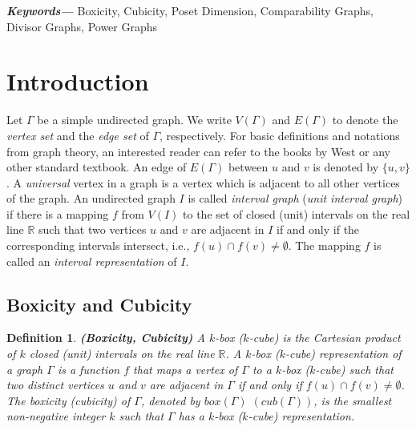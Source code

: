 \documentclass[twoside, 11pt]{article}
\newtheorem{definition}{Definition}
\newcommand{\G}{\Gamma}
\providecommand{\keywords}[1]
{
  \small	
  \textbf{\textit{Keywords---}} #1
}
\begin{document}
\keywords{Boxicity, Cubicity, Poset Dimension, Comparability Graphs, Divisor Graphs, Power Graphs}

\section{Introduction}\label{intro}

Let $\Gamma$ be a simple undirected graph. We write $V(\G)$ and $E(\G)$ to denote the \textit{vertex set} and the \textit{edge set} of $\G$, respectively. For basic definitions and notations from graph theory, an interested reader can refer to the books by West \cite{west2001introduction} or any other standard textbook. An edge of $E(\G)$ between $u$ and $v$ is denoted by $\{u,v\}$. A \textit{universal} vertex in a graph is a vertex which is adjacent to all other vertices of the graph. %
 An undirected graph $I$ is called \textit{interval graph} (\textit{unit interval graph}) if there is a mapping $f$ from $V(I)$ to the set of closed (unit) intervals on the real line $\mathbb{R}$ such that two vertices $u$ and $v$ are adjacent in $I$ if and only if the corresponding intervals intersect, i.e., $f(u) \cap f(v) \neq \emptyset$. The mapping $f$ is called an \textit{interval representation} of $I$.

\subsection{Boxicity and Cubicity}

\begin{definition}\label{box cub def}\textbf{(Boxicity, Cubicity)}
     A $k$-box ($k$-cube) is the Cartesian product of $k$ closed (unit) intervals on the real line $\mathbb{R}$. A $k$-box ($k$-cube) representation of a graph $\G$ is a function $f$ that maps a vertex of $\G$ to a $k$-box ($k$-cube) such that two distinct vertices $u$ and $v$ are adjacent in $\G$ if and only if $f(u) \cap f(v) \neq \emptyset$. The boxicity (cubicity) of $\G$, denoted by $box(\G)$ $(cub(\G))$, is the smallest non-negative integer $k$ such that $\G$ has a $k$-box ($k$-cube) representation.
     
\end{definition}
\end{document}

